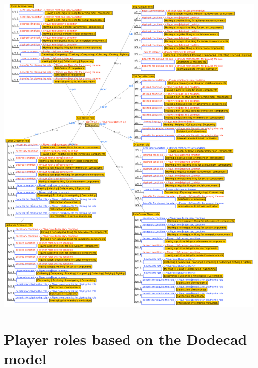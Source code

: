 \includegraphics[width=1\textwidth]{images/appendix/player-roles-based-yee.png}

\section{Player roles based on the Dodecad model}
\label{sec:player-roles-based-dodecad}

